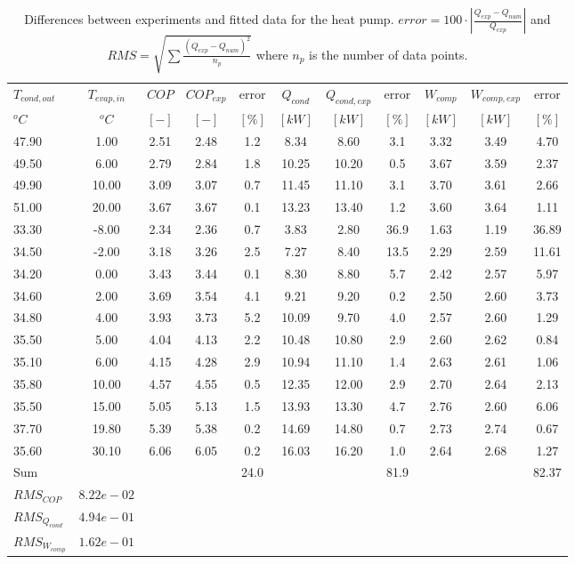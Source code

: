 \documentclass[english]{SPFShortReport}
\begin{document}
\begin{table}[!ht]
\begin{small}
\caption{Differences between experiments and fitted data for the heat pump.          $error=100 \cdot |\frac{Q_{exp}-Q_{num}}{Q_{exp}}|$ and $RMS = \sqrt { \sum{\frac{(Q_{exp}-Q_{num})^2}{n_p}} }$ where $n_p$ is the number of data points.}
\begin{center}
\resizebox{12cm}{!} 
{
\begin{tabular}{l | c c c c c c c c c c } 
\hline
\hline
$T_{cond,out}$ &$T_{evap,in}$ &$COP$ &$COP_{exp}$ &error &$Q_{cond}$ &$Q_{cond,exp}$ &error &$W_{comp}$ &$W_{comp,exp}$ &error \\ 
$^oC$ &$^oC$ &$[-]$ &$[-]$ &$[\%]$ &$[kW]$ &$[kW]$ &$[\%]$ &$[kW]$ &$[kW]$ &$[\%]$\\ 
\hline
47.90  & 1.00 & 2.51 & 2.48 & 1.2 & 8.34 & 8.60 & 3.1 & 3.32 & 3.49 & 4.70\\ 
49.50  & 6.00 & 2.79 & 2.84 & 1.8 & 10.25 & 10.20 & 0.5 & 3.67 & 3.59 & 2.37\\ 
49.90  & 10.00 & 3.09 & 3.07 & 0.7 & 11.45 & 11.10 & 3.1 & 3.70 & 3.61 & 2.66\\ 
51.00  & 20.00 & 3.67 & 3.67 & 0.1 & 13.23 & 13.40 & 1.2 & 3.60 & 3.64 & 1.11\\ 
33.30  & -8.00 & 2.34 & 2.36 & 0.7 & 3.83 & 2.80 & 36.9 & 1.63 & 1.19 & 36.89\\ 
34.50  & -2.00 & 3.18 & 3.26 & 2.5 & 7.27 & 8.40 & 13.5 & 2.29 & 2.59 & 11.61\\ 
34.20  & 0.00 & 3.43 & 3.44 & 0.1 & 8.30 & 8.80 & 5.7 & 2.42 & 2.57 & 5.97\\ 
34.60  & 2.00 & 3.69 & 3.54 & 4.1 & 9.21 & 9.20 & 0.2 & 2.50 & 2.60 & 3.73\\ 
34.80  & 4.00 & 3.93 & 3.73 & 5.2 & 10.09 & 9.70 & 4.0 & 2.57 & 2.60 & 1.29\\ 
35.50  & 5.00 & 4.04 & 4.13 & 2.2 & 10.48 & 10.80 & 2.9 & 2.60 & 2.62 & 0.84\\ 
35.10  & 6.00 & 4.15 & 4.28 & 2.9 & 10.94 & 11.10 & 1.4 & 2.63 & 2.61 & 1.06\\ 
35.80  & 10.00 & 4.57 & 4.55 & 0.5 & 12.35 & 12.00 & 2.9 & 2.70 & 2.64 & 2.13\\ 
35.50  & 15.00 & 5.05 & 5.13 & 1.5 & 13.93 & 13.30 & 4.7 & 2.76 & 2.60 & 6.06\\ 
37.70  & 19.80 & 5.39 & 5.38 & 0.2 & 14.69 & 14.80 & 0.7 & 2.73 & 2.74 & 0.67\\ 
35.60  & 30.10 & 6.06 & 6.05 & 0.2 & 16.03 & 16.20 & 1.0 & 2.64 & 2.68 & 1.27\\ 
\hline 
 Sum &  & &  & 24.0 &  &  & 81.9 & &  & 82.37\\ 
\hline 
 $RMS_{COP}$ & $8.22e-02$ \\ 
 $RMS_{Q_{cond}}$ & $4.94e-01$ \\ 
 $RMS_{W_{comp}}$ & $1.62e-01$ \\ 
\hline
\hline
\end{tabular}
}
\label{ErrorsTable}
\end{center}
\end{small}
\end{table}
\end{document}
